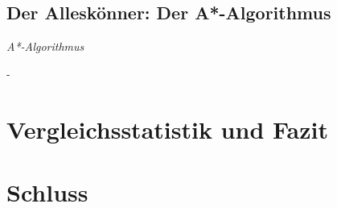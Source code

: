 \documentclass[12pt]{article}
\begin{document}
\subsection{Der Alleskönner: Der A*-Algorithmus}
\begin{algorithm}
\caption{\textit{A*-Algorithmus} \label{alg:astar}}
\begin{algorithmic}[1]
\Statex
{}
\Statex
\end{algorithmic}
\end{algorithm}
\newpage
-
\newpage

\section{Vergleichsstatistik und Fazit}
\newpage
\section{Schluss}
\newpage
\end{document}
